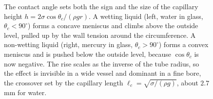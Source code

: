 \begin{figure}[htbp]
\begin{tikzpicture}[scale=1.0]
\end{tikzpicture}
\caption[Capillary rise and depression]{The contact angle sets both the sign and
the size of the capillary height $h=2\sigma\cos\theta_c/(\rho g r)$. A wetting
liquid (left, water in glass, $\theta_c<90^{\circ}$) forms a concave meniscus
and climbs above the outside level, pulled up by the wall tension around the
circumference. A non-wetting liquid (right, mercury in glass,
$\theta_c>90^{\circ}$) forms a convex meniscus and is pushed below the outside
level, because $\cos\theta_c$ is now negative. The rise scales as the inverse of
the tube radius, so the effect is invisible in a wide vessel and dominant in a
fine bore, the crossover set by the capillary length $\ell_c=\sqrt{\sigma/(\rho
g)}$, about $2.7$ mm for water.}
\label{fig:vol03ch10:capillary}
\end{figure}
